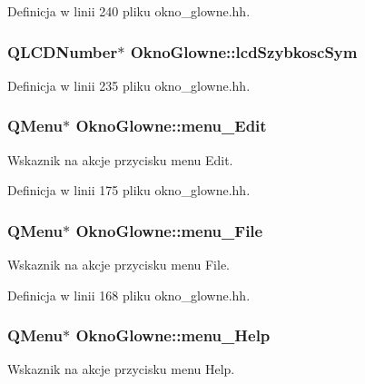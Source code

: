 Definicja w linii 240 pliku okno\+\_\+glowne.\+hh.

\hypertarget{class_okno_glowne_ab100c00d4ba33d896fd0985ac366296a}{}
\subsubsection[{lcd\+Szybkosc\+Sym}]{\setlength{\rightskip}{0pt plus 5cm}Q\+L\+C\+D\+Number$\ast$ Okno\+Glowne\+::lcd\+Szybkosc\+Sym}\label{class_okno_glowne_ab100c00d4ba33d896fd0985ac366296a}


Definicja w linii 235 pliku okno\+\_\+glowne.\+hh.

\hypertarget{class_okno_glowne_a93afadd0ec22ce6a7e29acc5dd2423a2}{}
\subsubsection[{menu\+\_\+\+Edit}]{\setlength{\rightskip}{0pt plus 5cm}Q\+Menu$\ast$ Okno\+Glowne\+::menu\+\_\+\+Edit}\label{class_okno_glowne_a93afadd0ec22ce6a7e29acc5dd2423a2}
Wskaznik na akcje przycisku menu Edit. 

Definicja w linii 175 pliku okno\+\_\+glowne.\+hh.

\hypertarget{class_okno_glowne_a1ba162db2d0b06b0f8963e61b3806875}{}
\subsubsection[{menu\+\_\+\+File}]{\setlength{\rightskip}{0pt plus 5cm}Q\+Menu$\ast$ Okno\+Glowne\+::menu\+\_\+\+File}\label{class_okno_glowne_a1ba162db2d0b06b0f8963e61b3806875}
Wskaznik na akcje przycisku menu File. 

Definicja w linii 168 pliku okno\+\_\+glowne.\+hh.

\hypertarget{class_okno_glowne_ab17be6714913af0cdf4e7de7cb6210d1}{}
\subsubsection[{menu\+\_\+\+Help}]{\setlength{\rightskip}{0pt plus 5cm}Q\+Menu$\ast$ Okno\+Glowne\+::menu\+\_\+\+Help}\label{class_okno_glowne_ab17be6714913af0cdf4e7de7cb6210d1}
Wskaznik na akcje przycisku menu Help. 

